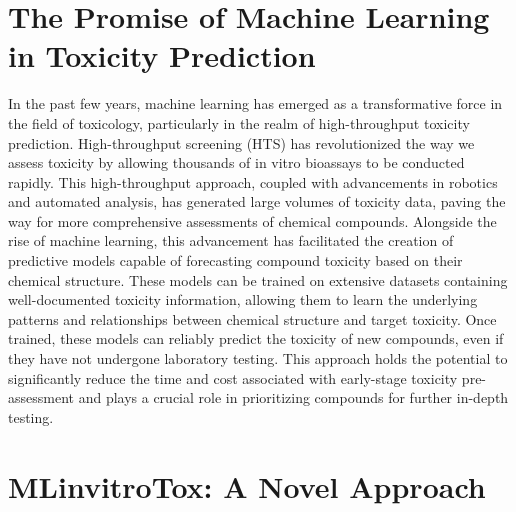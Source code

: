 \section{The Promise of Machine Learning in Toxicity Prediction}

In the past few years, machine learning has emerged as a transformative force in the field of toxicology, particularly in the realm of high-throughput toxicity prediction. High-throughput screening (HTS) has revolutionized the way we assess toxicity by allowing thousands of in vitro bioassays to be conducted rapidly. This high-throughput approach, coupled with advancements in robotics and automated analysis, has generated large volumes of toxicity data, paving the way for more comprehensive assessments of chemical compounds.
Alongside the rise of machine learning, this advancement has facilitated the creation of predictive models capable of forecasting compound toxicity based on their chemical structure. These models can be trained on extensive datasets containing well-documented toxicity information, allowing them to learn the underlying patterns and relationships between chemical structure and target toxicity. Once trained, these models can reliably predict the toxicity of new compounds, even if they have not undergone laboratory testing. This approach holds the potential to significantly reduce the time and cost associated with early-stage toxicity pre-assessment and plays a crucial role in prioritizing compounds for further in-depth testing.

\section{MLinvitroTox: A Novel Approach}

